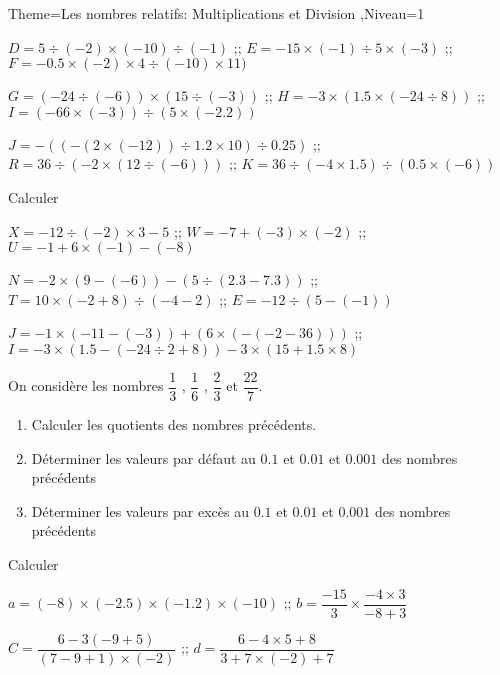 \documentclass[a4paper,12pt]{article}
\begin{document}
\begin{Maquette}[Fiche]{Theme=Les nombres relatifs: Multiplications et Division ,Niveau=1}
\begin{exercice}
$D=5\div (-2)\times (-10)\div (-1)$ ;; $E=-15\times (-1)\div 5\times (-3)$ ;; $F=-0.5\times (-2)\times 4\div (-10)\times 11)$

$G=(-24\div (-6))\times (15\div (-3))$ ;; $H=-3\times (1.5\times (-24\div 8))$ ;; $I=(-66\times (-3))\div (5\times (-2.2))$

$J=-((-(2\times (-12))\div 1.2\times 10)\div 0.25)$ ;; $R=36\div(-2\times (12\div (-6)))$ ;; $K=36\div (-4\times 1.5)\div (0.5\times (-6))$
\end{exercice}

\begin{exercice}
Calculer 

$X=-12\div (-2)\times 3-5$ ;; $W=-7+(-3)\times (-2)$ ;; $U=-1+6\times (-1)-(-8)$

$N=-2\times (9-(-6))-(5\div(2.3-7.3))$ ;; $T=10\times (-2+8)\div (-4-2)$ ;; $E=-12\div (5-(-1))$

$J=-1\times (-11-(-3))+(6\times (-(-2-36)))$ ;; $I=-3\times(1.5-(-24\div 2+8))-3\times (15+1.5\times 8)$

\end{exercice}

\begin{exercice}
On considère les nombres $\dfrac{1}{3}$ , $\dfrac{1}{6}$ , $\dfrac{2}{3}$ et  $\dfrac{22}{7}$.
\begin{enumerate}
\item Calculer les quotients des nombres précédents.
\item Déterminer les valeurs par défaut  au $0.1$ et $0.01$ et $0.001$ des nombres précédents
\item Déterminer les valeurs par excès  au $0.1$ et $0.01$ et $0.001$ des nombres précédents
\end{enumerate}
\end{exercice}

\begin{exercice}
Calculer 

$a=(-8)\times (-2.5) \times (-1.2)\times (-10)$ ;; $b=\dfrac{-15}{3}\times \dfrac{-4\times 3}{-8+3}$

$C=\dfrac{6-3(-9+5)}{(7-9+1)\times (-2)}$ ;; $d=\dfrac{6-4\times 5+8}{3+7\times(-2)+7}$
\end{exercice}


\end{Maquette}
\end{document}
